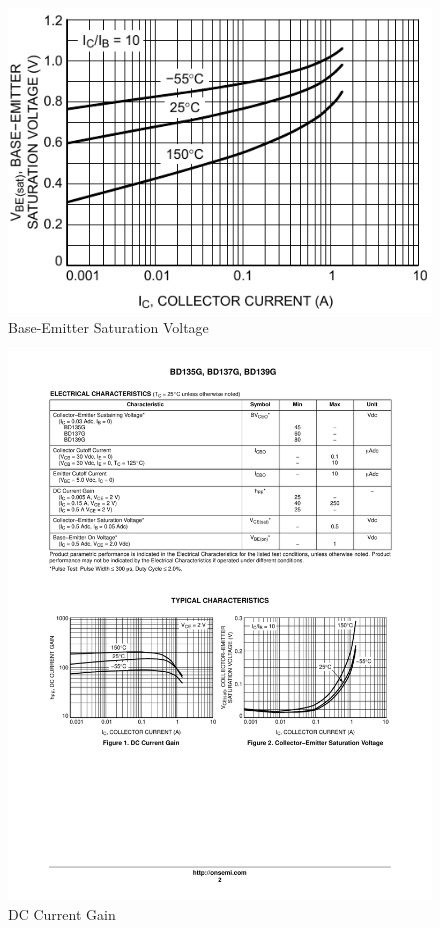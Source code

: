 \begin{figure}[H]
    \centering
    \includegraphics[]{Graphics/Practice 8/BJT/DATASHEET/VBE-IC.pdf}
    \caption{Base-Emitter Saturation Voltage~\autocite{BD135}}
    \label{fig:VBE_SAT}
\end{figure}

\begin{figure}[H]
    \centering
    \includegraphics[]{Graphics/Practice 8/BJT/DATASHEET/BETA-IC.pdf}
    \caption{DC Current Gain~\autocite{BD135}}
    \label{fig:DC_GAIN}
\end{figure}

